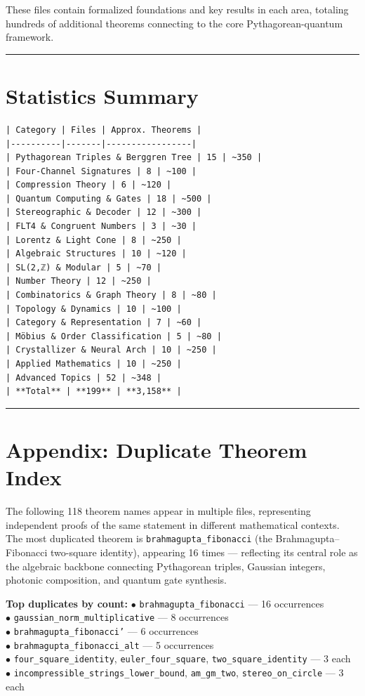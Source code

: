 \documentclass[12pt,a4paper,openany]{book}
\begin{document}
These files contain formalized foundations and key results in each area, totaling hundreds of additional theorems connecting to the core Pythagorean-quantum framework.

\bigskip\hrule\bigskip

\section{Statistics Summary}

\begin{verbatim}
| Category | Files | Approx. Theorems |
|----------|-------|-----------------|
| Pythagorean Triples & Berggren Tree | 15 | ~350 |
| Four-Channel Signatures | 8 | ~100 |
| Compression Theory | 6 | ~120 |
| Quantum Computing & Gates | 18 | ~500 |
| Stereographic & Decoder | 12 | ~300 |
| FLT4 & Congruent Numbers | 3 | ~30 |
| Lorentz & Light Cone | 8 | ~250 |
| Algebraic Structures | 10 | ~120 |
| SL(2,ℤ) & Modular | 5 | ~70 |
| Number Theory | 12 | ~250 |
| Combinatorics & Graph Theory | 8 | ~80 |
| Topology & Dynamics | 10 | ~100 |
| Category & Representation | 7 | ~60 |
| Möbius & Order Classification | 5 | ~80 |
| Crystallizer & Neural Arch | 10 | ~250 |
| Applied Mathematics | 10 | ~250 |
| Advanced Topics | 52 | ~348 |
| **Total** | **199** | **3,158** |
\end{verbatim}

\bigskip\hrule\bigskip

\section{Appendix: Duplicate Theorem Index}

The following 118 theorem names appear in multiple files, representing independent proofs of the same statement in different mathematical contexts. The most duplicated theorem is \texttt{brahmagupta\_fibonacci} (the Brahmagupta–Fibonacci two-square identity), appearing 16 times — reflecting its central role as the algebraic backbone connecting Pythagorean triples, Gaussian integers, photonic composition, and quantum gate synthesis.

\textbf{Top duplicates by count:}
\noindent$\bullet$ \texttt{brahmagupta\_fibonacci} — 16 occurrences\\
\noindent$\bullet$ \texttt{gaussian\_norm\_multiplicative} — 8 occurrences\\
\noindent$\bullet$ \texttt{brahmagupta\_fibonacci'} — 6 occurrences\\
\noindent$\bullet$ \texttt{brahmagupta\_fibonacci\_alt} — 5 occurrences\\
\noindent$\bullet$ \texttt{four\_square\_identity}, \texttt{euler\_four\_square}, \texttt{two\_square\_identity} — 3 each\\
\noindent$\bullet$ \texttt{incompressible\_strings\_lower\_bound}, \texttt{am\_gm\_two}, \texttt{stereo\_on\_circle} — 3 each\\
\end{document}

